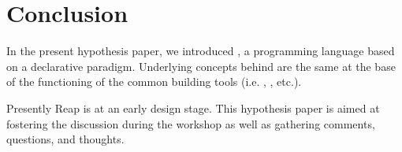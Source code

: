 \section{Conclusion}

In the present hypothesis paper, we introduced \Reap, a programming language 
based on a declarative paradigm. Underlying concepts behind \Reap are the same 
at the base of the functioning of the common building tools (i.e. , 
, etc.).  

Presently Reap is at an early design stage. This hypothesis paper
is aimed at fostering the discussion during the workshop as well as gathering 
comments, questions, and thoughts. 

% 
% 
% 
%    
% 
% 
% 
% 

